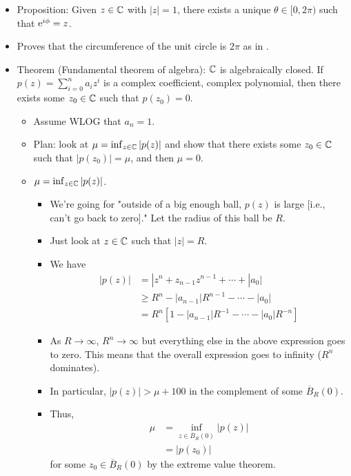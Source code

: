 \documentclass[../notes.tex]{subfiles}
\begin{document}
\begin{itemize}
\begin{itemize}
    \end{itemize}
    \item Proposition: Given $z\in\C$ with $|z|=1$, there exists a unique $\theta\in[0,2\pi)$ such that $\e[i\phi]=z$.
    \item Proves that the circumference of the unit circle is $2\pi$ as in \textcite{bib:Rudin}.
    \item Theorem (Fundamental theorem of algebra): $\C$ is algebraically closed. If $p(z)=\sum_{i=0}^na_iz^i$ is a complex coefficient, complex polynomial, then there exists some $z_0\in\C$ such that $p(z_0)=0$.
    \begin{itemize}
        \item Assume WLOG that $a_n=1$.
        \item Plan: look at $\mu=\inf_{z\in\C}|p(z)|$ and show that there exists some $z_0\in\C$ such that $|p(z_0)|=\mu$, and then $\mu=0$.
        \item $\mu=\inf_{z\in\C}|p(z)|$.
        \begin{itemize}
            \item We're going for "outside of a big enough ball, $p(z)$ is large [i.e., can't go back to zero]." Let the radius of this ball be $R$.
            \item Just look at $z\in\C$ such that $|z|=R$.
            \item We have
            \begin{align*}
                |p(z)| &= |z^n+z_{n-1}z^{n-1}+\cdots+|a_0|\\
                &\geq R^n-|a_{n-1}|R^{n-1}-\cdots-|a_0|\\
                &= R^n[1-|a_{n-1}|R^{-1}-\cdots-|a_0|R^{-n}]
            \end{align*}
            \item As $R\to\infty$, $R^n\to\infty$ but everything else in the above expression goes to zero. This means that the overall expression goes to infinity ($R^n$ dominates).
            \item In particular, $|p(z)|>\mu+100$ in the complement of some $\overline{B}_R(0)$.
            \item Thus,
            \begin{align*}
                \mu &= \inf_{z\in\overline{B}_R(0)}|p(z)|\\
                &= |p(z_0)|
            \end{align*}
            for some $z_0\in\overline{B}_R(0)$ by the extreme value theorem.
        \end{itemize}

\end{itemize}
\end{itemize}
\end{document}

